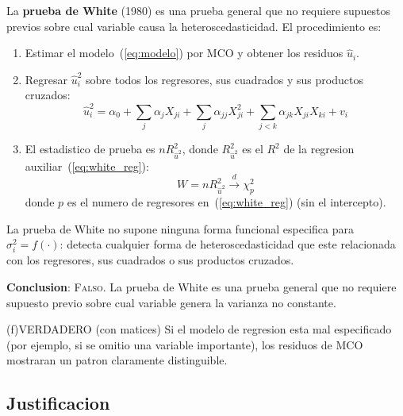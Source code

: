 \documentclass[12pt, letterpaper]{article}
\theoremstyle{remark}
\begin{document}
La \textbf{prueba de White} (1980) es una prueba general que no requiere
supuestos previos sobre cual variable causa la heteroscedasticidad.
El procedimiento es:

\begin{enumerate}[leftmargin=1.8em, itemsep=4pt]
  \item Estimar el modelo~(\ref{eq:modelo}) por MCO y obtener los residuos $\hat u_i$.
  \item Regresar $\hat u_i^2$ sobre todos los regresores, sus cuadrados y sus
    productos cruzados:
    \begin{equation}
      \hat u_i^2 = \alpha_0 + \sum_j \alpha_j X_{ji}
                 + \sum_j \alpha_{jj} X_{ji}^2
                 + \sum_{j<k} \alpha_{jk} X_{ji} X_{ki}
                 + v_i
      \label{eq:white_reg}
    \end{equation}
  \item El estadistico de prueba es $nR^2_{\hat u^2}$, donde $R^2_{\hat u^2}$
    es el $R^2$ de la regresion auxiliar~(\ref{eq:white_reg}):
    \begin{equation}
      W = nR^2_{\hat u^2} \xrightarrow{d} \chi^2_p
      \label{eq:white_stat}
    \end{equation}
    donde $p$ es el numero de regresores en~(\ref{eq:white_reg}) (sin el intercepto).
\end{enumerate}

La prueba de White no supone ninguna forma funcional especifica para
$\sigma_i^2 = f(\cdot)$: detecta cualquier forma de heteroscedasticidad que
este relacionada con los regresores, sus cuadrados o sus productos cruzados.

\textbf{Conclusion}: \textsc{Falso}. La prueba de White es una prueba general
que no requiere supuesto previo sobre cual variable genera la varianza no constante.

\bigskip

\begin{verdict}{(f)}{VERDADERO (con matices)}
  Si el modelo de regresion esta mal especificado (por ejemplo, si se omitio
  una variable importante), los residuos de MCO mostraran un patron claramente
  distinguible.
\end{verdict}

\subsection*{Justificacion}
\end{document}

